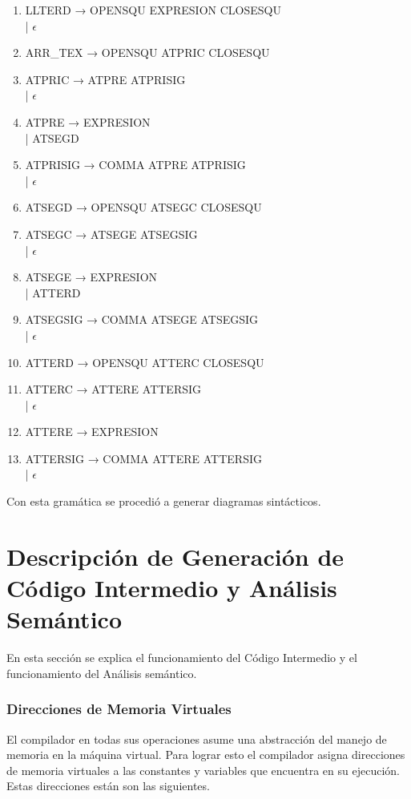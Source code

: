 {\begin{enumerate}
    \item LLTERD → OPENSQU EXPRESION CLOSESQU \\ | $\epsilon$
    \item ARR\_TEX → OPENSQU ATPRIC CLOSESQU
    \item ATPRIC → ATPRE ATPRISIG \\ | $\epsilon$
    \item ATPRE → EXPRESION \\ | ATSEGD
    \item ATPRISIG → COMMA ATPRE ATPRISIG \\ | $\epsilon$
    \item ATSEGD → OPENSQU ATSEGC CLOSESQU
    \item ATSEGC → ATSEGE ATSEGSIG \\ | $\epsilon$
    \item ATSEGE → EXPRESION \\ | ATTERD
    \item ATSEGSIG → COMMA ATSEGE ATSEGSIG \\ | $\epsilon$
    \item ATTERD → OPENSQU ATTERC CLOSESQU
    \item ATTERC → ATTERE ATTERSIG \\ | $\epsilon$
    \item ATTERE → EXPRESION
    \item ATTERSIG → COMMA ATTERE ATTERSIG \\ | $\epsilon$
    
\end{enumerate}}

Con esta gramática se procedió a generar diagramas sintácticos.


\FloatBarrier
\newpage
\section{Descripción de Generación de Código Intermedio y Análisis Semántico}

En esta sección se explica el funcionamiento del Código Intermedio y el funcionamiento del Análisis semántico.
\subsubsection{Direcciones de Memoria Virtuales}
El compilador en todas sus operaciones asume una abstracción del manejo de memoria en la máquina virtual. Para lograr esto el compilador asigna direcciones de memoria virtuales a las constantes y variables que encuentra en su ejecución. Estas direcciones están son las siguientes.

